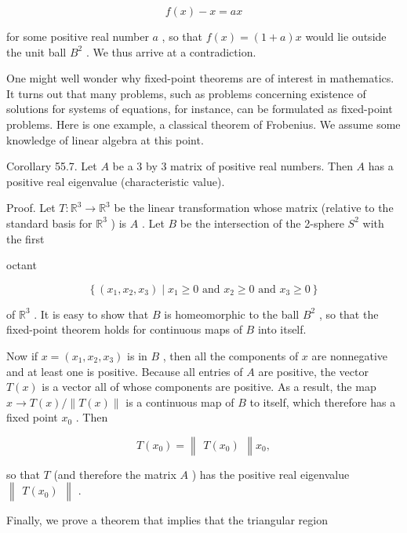\documentclass[10pt]{article}
\begin{document}
\[
f\left( x\right)  - x = {ax}
\]

for some positive real number \(a\) , so that \(f\left( x\right)  = \left( {1 + a}\right) x\) would lie outside the unit ball \({B}^{2}\) . We thus arrive at a contradiction.

One might well wonder why fixed-point theorems are of interest in mathematics. It turns out that many problems, such as problems concerning existence of solutions for systems of equations, for instance, can be formulated as fixed-point problems. Here is one example, a classical theorem of Frobenius. We assume some knowledge of linear algebra at this point.

Corollary 55.7. Let \(A\) be a 3 by 3 matrix of positive real numbers. Then \(A\) has a positive real eigenvalue (characteristic value).

Proof. Let \(T : {\mathbb{R}}^{3} \rightarrow  {\mathbb{R}}^{3}\) be the linear transformation whose matrix (relative to the standard basis for \({\mathbb{R}}^{3}\) ) is \(A\) . Let \(B\) be the intersection of the 2-sphere \({S}^{2}\) with the first

octant

\[
\left\{  {\left( {{x}_{1},{x}_{2},{x}_{3}}\right)  \mid  {x}_{1} \geq  0\text{ and }{x}_{2} \geq  0\text{ and }{x}_{3} \geq  0}\right\}
\]

of \({\mathbb{R}}^{3}\) . It is easy to show that \(B\) is homeomorphic to the ball \({B}^{2}\) , so that the fixed-point theorem holds for continuous maps of \(B\) into itself.

Now if \(x = \left( {{x}_{1},{x}_{2},{x}_{3}}\right)\) is in \(B\) , then all the components of \(x\) are nonnegative and at least one is positive. Because all entries of \(A\) are positive, the vector \(T\left( x\right)\) is a vector all of whose components are positive. As a result, the map \(x \rightarrow  T\left( x\right) /\parallel T\left( x\right) \parallel\) is a continuous map of \(B\) to itself, which therefore has a fixed point \({x}_{0}\) . Then

\[
T\left( {x}_{0}\right)  = \begin{Vmatrix}{T\left( {x}_{0}\right) }\end{Vmatrix}{x}_{0},
\]

so that \(T\) (and therefore the matrix \(A\) ) has the positive real eigenvalue \(\begin{Vmatrix}{T\left( {x}_{0}\right) }\end{Vmatrix}\) .

Finally, we prove a theorem that implies that the triangular region
\end{document}
